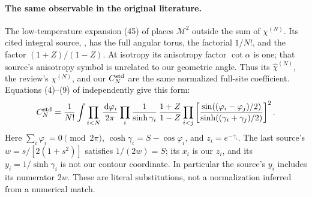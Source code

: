\documentclass[11pt]{article}
\numberwithin{equation}{section}
\theoremstyle{definition}
\newcommand{\dd}{\,\mathrm d}
\newcommand{\M}{\mathcal M}
\begin{document}
\paragraph{The same observable in the original literature.}
The low-temperature expansion (45) of \cite{McCoyMaillard2012}
places \(\M^2\) outside the sum of \(\chi^{(N)}\).
Its cited integral source, \cite[(1.10), (3.13), (3.17)--(3.20)]{Orrick2001},
has the full angular torus, the factorial \(1/N!\), and the factor
\((1+Z)/(1-Z)\). At isotropy its anisotropy factor \(\cot\alpha\)
is one; that source's anisotropy symbol is unrelated to our geometric
angle. Thus its \(\widehat\chi^{(N)}\), the review's \(\chi^{(N)}\),
and our \(C_N^{\rm std}\) are the same normalized full-site coefficient.
Equations (4)--(9) of \cite{Boukraa2008} independently give this form:
\[
 C_N^{\rm std}=\frac1{N!}
 \int\prod_{i<N}\frac{\dd\varphi_i}{2\pi}
 \prod_i\frac1{\sinh\gamma_i}\,
 \frac{1+Z}{1-Z}
 \prod_{i<j}\left[
  \frac{\sin((\varphi_i-\varphi_j)/2)}
       {\sinh((\gamma_i+\gamma_j)/2)}
             \right]^2 .
\]
Here \(\sum_i\varphi_i=0\pmod{2\pi}\),
\(\cosh\gamma_i=S-\cos\varphi_i\), and \(z_i=e^{-\gamma_i}\).
The last source's \(w=s/[2(1+s^2)]\) satisfies \(1/(2w)=S\);
its \(x_i\) is our \(z_i\), and its \(y_i=1/\sinh\gamma_i\)
is not our contour coordinate. In particular the source's \(y_i\)
includes its numerator \(2w\). These are literal substitutions,
not a normalization inferred from a numerical match.
\end{document}
